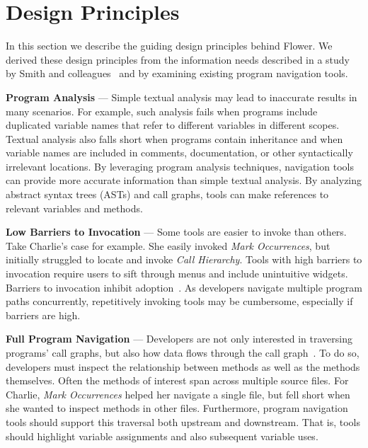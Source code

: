 \documentclass[conference]{IEEEtran}
\begin{document}
\section{Design Principles}
\label{DesignPrinciples}
In this section we describe the guiding design principles behind Flower. We derived these design principles from the information needs described in a study by Smith and colleagues~\cite{Smith2015} and by examining existing program navigation tools.
 
\vspace{1em} 
\noindent\textbf{Program Analysis} ---
Simple textual analysis may lead to inaccurate results in many scenarios. For example, such analysis fails when programs include duplicated variable names that refer to different variables in different scopes. Textual analysis also falls short when programs contain inheritance and when variable names are included in comments, documentation, or other syntactically irrelevant locations.
By leveraging program analysis techniques, navigation tools can provide more accurate information than simple textual analysis.
By analyzing abstract syntax trees (ASTs) and call graphs, tools can make references to relevant variables and methods. 

\vspace{1em} 
\noindent\textbf{Low Barriers to Invocation} ---
Some tools are easier to invoke than others. 
Take Charlie's case for example.
She easily invoked \emph{Mark Occurrences}, but initially struggled to locate and invoke \emph{Call Hierarchy}.
Tools with high barriers to invocation require users to sift through menus and include unintuitive widgets. 
Barriers to invocation inhibit adoption~\cite{johnson2013don}.
As developers navigate multiple program paths concurrently, repetitively invoking tools may be cumbersome, especially if barriers are high. 


\vspace{1em} 
\noindent\textbf{Full Program Navigation}  ---
Developers are not only interested in traversing programs' call graphs, but also how data flows through the call graph~\cite{Smith2015}.
To do so, developers must inspect the relationship between methods as well as the methods themselves.
Often the methods of interest span across multiple source files.
For Charlie, \emph{Mark Occurrences} helped her navigate a single file, but fell short when she wanted to inspect methods in other files.
Furthermore, program navigation tools should support this traversal both upstream and downstream. 
That is, tools should highlight variable assignments and also subsequent variable uses. 
\end{document}
